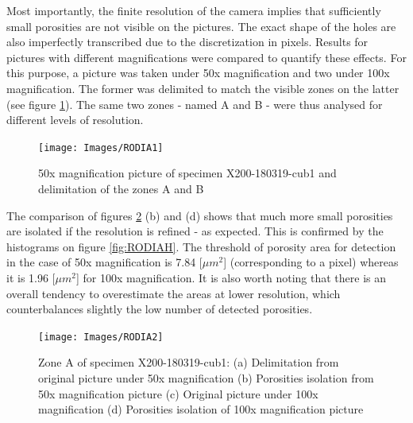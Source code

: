 Most importantly, the finite resolution of the camera implies that sufficiently small porosities are not visible on the pictures. The exact shape of the holes are also imperfectly transcribed due to the discretization in pixels. Results for pictures with different magnifications were compared to quantify these effects. For this purpose, a picture was taken under 50x magnification and two under 100x magnification. The former was delimited to match the visible zones on the latter (see figure \ref{fig:RODIA1}). The same two zones - named A and B - were thus analysed for different levels of resolution.\\

\begin{figure}[th]
\centering
\centerline{\texttt{[image: Images/RODIA1]}}
\decoRule
\caption[50x magnification picture of specimen X200-180319-cub1 and delimitation of the zones A and B]{50x magnification picture of specimen X200-180319-cub1 and delimitation of the zones A and B}
\label{fig:RODIA1}
\end{figure}

The comparison of figures \ref{fig:RODIA2} (b) and (d) shows that much more small porosities are isolated if the resolution is refined - as expected. This is confirmed by the histograms on figure \ref{fig:RODIAH}. The threshold of porosity area for detection in the case of 50x magnification is 7.84 [$\mu m^2$] (corresponding to a pixel) whereas it is 1.96 [$\mu m^2$] for 100x magnification.  It is also worth noting that there is an overall tendency to overestimate the areas at lower resolution, which counterbalances slightly the low number of detected porosities. \\

\begin{figure}[th]
\centering
\centerline{\texttt{[image: Images/RODIA2]}}
\decoRule
\caption[Zone A of specimen X200-180319-cub1: (a) Delimitation from original picture under 50x magnification (b) Porosities isolation from 50x magnification picture (c) Original picture under 100x magnification (d) Porosities isolation of 100x magnification picture]{Zone A of specimen X200-180319-cub1: (a) Delimitation from original picture under 50x magnification (b) Porosities isolation from 50x magnification picture (c) Original picture under 100x magnification (d) Porosities isolation of 100x magnification picture}
\label{fig:RODIA2}
\end{figure}

